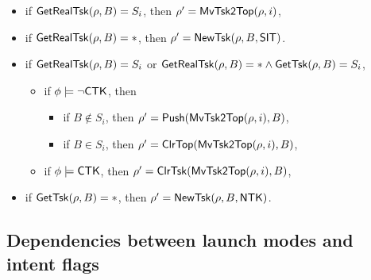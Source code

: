 {\begin{itemize}
\end{itemize}

\noindent {}
\begin{itemize}
	\item if $\mathsf{GetRealTsk}(\rho, B) = S_i$, then $\rho' = \mathsf{MvTsk2Top}(\rho, i)$,
	\item if $\mathsf{GetRealTsk}(\rho, B) = *$, then $\rho' = \mathsf{NewTsk}(\rho, B, {\sf SIT})$.
\end{itemize}

\noindent {}
\begin{itemize}
	\item if $\mathsf{GetRealTsk}(\rho, B) = S_i$ 
	or $ \mathsf{GetRealTsk}(\rho, B) = * \wedge \mathsf{GetTsk}(\rho, B) = S_i$, 
	\begin{itemize}
		\item if $\phi \models \neg {\sf CTK}$, then
		\begin{itemize}
			\item if $B \not \in S_i$, then $\rho' = \mathsf{Push}(\mathsf{MvTsk2Top}(\rho, i), B)$,
			\item if $B  \in S_i$, 	then $\rho' =  \mathsf{ClrTop}(\mathsf{MvTsk2Top}(\rho, i), B)$,
		\end{itemize}
		\item if $\phi \models {\sf CTK}$, then
		$\rho' = \mathsf{ClrTsk}(\mathsf{MvTsk2Top}(\rho, i), B)$,
	\end{itemize}
\item if $\mathsf{GetTsk}(\rho, B) = *$, then $\rho' = \mathsf{NewTsk}(\rho, B, {\sf NTK})$.
\end{itemize}
}



\subsection*{Dependencies between launch modes and intent flags}

